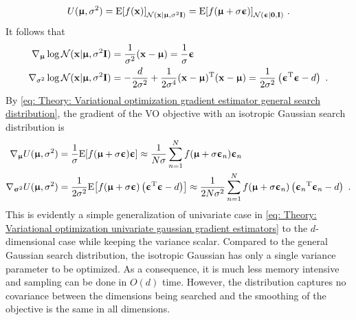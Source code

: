 \begin{equation}
    U({\boldsymbol{\upmu}},\sigma^2) = \text{E}{\left[f({\mathbf{x}})\right]}_{\mathcal{N}({\mathbf{x}}|{{\boldsymbol{\upmu}},\sigma^2{\mathbf{I}}})}  = \text{E}{\left[f({\boldsymbol{\upmu}}+ \sigma{\boldsymbol{\upepsilon}})\right]}_{\mathcal{N}({\boldsymbol{\upepsilon}}|{{\mathbf{0}},{\mathbf{I}}})} \ .
\end{equation}
It follows that
\begin{equation}\label{eq: Theory: Variational optimization multivariate isotropic gaussian search gradients}
    \begin{aligned}
        \nabla_{\boldsymbol{\upmu}} \log\mathcal{N}({\mathbf{x}}|{\boldsymbol{\upmu}},\sigma^2{\mathbf{I}}) &= \frac{1}{\sigma^2}({\mathbf{x}}-{\boldsymbol{\upmu}}) = \frac{1}{\sigma}{\boldsymbol{\upepsilon}}\\
        \nabla_{\sigma^2} \log\mathcal{N}({\mathbf{x}}|{\boldsymbol{\upmu}},\sigma^2{\mathbf{I}}) &= -\frac{d}{2\sigma^2} + \frac{1}{2\sigma^4}({\mathbf{x}}-{\boldsymbol{\upmu}}){^\mathrm{T}}({\mathbf{x}}-{\boldsymbol{\upmu}}) = \frac{1}{2\sigma^2}\left({\boldsymbol{\upepsilon}}{^\mathrm{T}}{\boldsymbol{\upepsilon}} - d\right) \ .
    \end{aligned}
\end{equation}
By \eqref{eq: Theory: Variational optimization gradient estimator general search distribution}, the gradient of the \gls{VO} objective with an isotropic Gaussian search distribution is
\begin{equation}
    \begin{aligned}
        \nabla_{\boldsymbol{\upmu}} U({\boldsymbol{\upmu}},\sigma^2) &= \frac{1}{\sigma}\text{E}{\left[f({\boldsymbol{\upmu}}+ \sigma{\boldsymbol{\upepsilon}}){\boldsymbol{\upepsilon}}\right]} \approx \frac{1}{N\sigma}\sum_{n=1}^N f({\boldsymbol{\upmu}}+\sigma{\boldsymbol{\upepsilon}}_n){\boldsymbol{\upepsilon}}_n\\
        \nabla_{{\boldsymbol{\upsigma}}^2} U({\boldsymbol{\upmu}},\sigma^2) &= \frac{1}{2\sigma^2}\text{E}{\left[f({\boldsymbol{\upmu}}+ \sigma{\boldsymbol{\upepsilon}})\left({\boldsymbol{\upepsilon}}{^\mathrm{T}}{\boldsymbol{\upepsilon}}-d\right)\right]} \approx \frac{1}{2N\sigma^2}\sum_{n=1}^N f({\boldsymbol{\upmu}} + \sigma{\boldsymbol{\upepsilon}}_n)\left({\boldsymbol{\upepsilon}}_n{^\mathrm{T}}{\boldsymbol{\upepsilon}}_n-d\right) \ .
    \end{aligned}\label{eq: Theory: Variational optimization multivariate isotropic gaussian gradient estimators}
\end{equation}
This is evidently a simple generalization of univariate case in \eqref{eq: Theory: Variational optimization univariate gaussian gradient estimators} to the $d$-dimensional case while keeping the variance scalar. Compared to the general Gaussian search distribution, the isotropic Gaussian has only a single variance parameter to be optimized. As a consequence, it is much less memory intensive and sampling can be done in $O(d)$ time. However, the distribution captures no covariance between the dimensions being searched and the smoothing of the objective is the same in all dimensions. 






